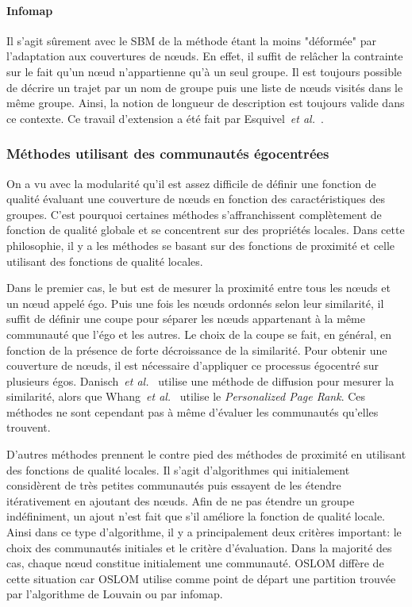 \paragraph{Infomap}
Il s'agit sûrement avec le SBM de la méthode étant la moins "déformée" par l'adaptation aux couvertures de n\oe uds.
En effet, il suffit de relâcher la contrainte sur le fait qu'un n\oe ud n'appartienne qu'à un seul groupe.
Il est toujours possible de décrire un trajet par un nom de groupe puis une liste de n\oe uds visités dans le même groupe.
Ainsi, la notion de longueur de description est toujours valide dans ce contexte.
Ce travail d'extension a été fait par Esquivel~\emph{et al.}~\cite{Esquivel2011}.

\subsubsection{Méthodes utilisant des communautés égocentrées}
On a vu avec la modularité qu'il est assez difficile de définir une fonction de qualité évaluant une couverture de n\oe uds en fonction des caractéristiques des groupes.
C'est pourquoi certaines méthodes s'affranchissent complètement de fonction de qualité globale et se concentrent sur des propriétés locales.
Dans cette philosophie, il y a les méthodes se basant sur des fonctions de proximité et celle utilisant des fonctions de qualité locales.

Dans le premier cas, le but est de mesurer la proximité entre tous les n\oe uds et un n\oe ud appelé égo.
Puis une fois les n\oe uds ordonnés selon leur similarité, il suffit de définir une coupe pour séparer les n\oe uds appartenant à la même communauté que l'égo et les autres.
Le choix de la coupe se fait, en général, en fonction de la présence de forte décroissance de la similarité.
Pour obtenir une couverture de n\oe uds, il est nécessaire d'appliquer ce processus égocentré sur plusieurs égos.
Danisch~\emph{et al.}~\cite{Danisch2012} utilise une méthode de diffusion pour mesurer la similarité, alors que Whang~\emph{et al.}~\cite{Whang2013} utilise le \emph{Personalized Page Rank}.
Ces méthodes ne sont cependant pas à même d'évaluer les communautés qu'elles trouvent.
\bigskip

D'autres méthodes prennent le contre pied des méthodes de proximité en utilisant des fonctions de qualité locales.
Il s'agit d'algorithmes qui initialement considèrent de très petites communautés puis essayent de les étendre itérativement en ajoutant des n\oe uds.
Afin de ne pas étendre un groupe indéfiniment, un ajout n'est fait que s'il améliore la fonction de qualité locale.
Ainsi dans ce type d'algorithme, il y a principalement deux critères important:
le choix des communautés initiales et le critère d'évaluation.
Dans la majorité des cas, chaque n\oe ud constitue initialement une communauté. 
OSLOM\cite{Lancichinetti2011a} diffère de cette situation car OSLOM utilise comme point de départ une partition trouvée par l'algorithme de Louvain ou par infomap.

